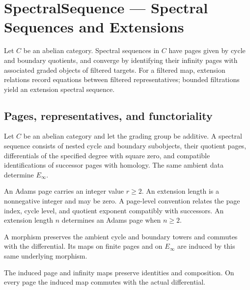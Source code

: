 \chapter{SpectralSequence --- Spectral Sequences and Extensions}
Let $C$ be an abelian category. Spectral sequences in $C$ have pages given by cycle and boundary quotients, and converge by identifying their infinity pages with associated graded objects of filtered targets. For a filtered map, extension relations record equations between filtered representatives; bounded filtrations yield an extension spectral sequence.



\section{Pages, representatives, and functoriality}

\begin{definition}
\label{sem:SpectralSequence:sequence}
Let $C$ be an abelian category and let the grading group be additive. A spectral sequence consists of nested cycle and boundary subobjects, their quotient pages, differentials of the specified degree with square zero, and compatible identifications of successor pages with homology. The same ambient data determine $E_\infty$.

An Adams page carries an integer value $r\geq2$. An extension length is a nonnegative integer and may be zero. A page-level convention relates the page index, cycle level, and quotient exponent compatibly with successors. An extension length $n$ determines an Adams page when $n\geq2$.

A morphism preserves the ambient cycle and boundary towers and commutes with the differential. Its maps on finite pages and on $E_\infty$ are induced by this same underlying morphism.

The induced page and infinity maps preserve identities and composition. On every page the induced map commutes with the actual differential.
\end{definition}


